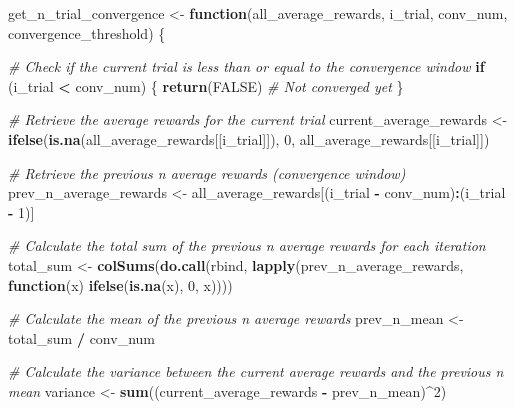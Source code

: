 \documentclass[
]{article}
\newenvironment{Shaded}{\begin{snugshade}}{\end{snugshade}}
\newcommand{\CommentTok}[1]{\textcolor[rgb]{0.56,0.35,0.01}{\textit{#1}}}
\newcommand{\ConstantTok}[1]{\textcolor[rgb]{0.56,0.35,0.01}{#1}}
\newcommand{\ControlFlowTok}[1]{\textcolor[rgb]{0.13,0.29,0.53}{\textbf{#1}}}
\newcommand{\DecValTok}[1]{\textcolor[rgb]{0.00,0.00,0.81}{#1}}
\newcommand{\FunctionTok}[1]{\textcolor[rgb]{0.13,0.29,0.53}{\textbf{#1}}}
\newcommand{\NormalTok}[1]{#1}
\newcommand{\OtherTok}[1]{\textcolor[rgb]{0.56,0.35,0.01}{#1}}
\newcommand{\SpecialCharTok}[1]{\textcolor[rgb]{0.81,0.36,0.00}{\textbf{#1}}}
\begin{document}
\begin{Shaded}
\begin{Highlighting}[]
\NormalTok{get\_n\_trial\_convergence }\OtherTok{\textless{}{-}} \ControlFlowTok{function}\NormalTok{(all\_average\_rewards, i\_trial, conv\_num, convergence\_threshold) \{}
  
  \CommentTok{\# Check if the current trial is less than or equal to the convergence window}
  \ControlFlowTok{if}\NormalTok{ (i\_trial }\SpecialCharTok{\textless{}}\NormalTok{ conv\_num) \{}
    \FunctionTok{return}\NormalTok{(}\ConstantTok{FALSE}\NormalTok{)  }\CommentTok{\# Not converged yet}
\NormalTok{  \}}
  
  \CommentTok{\# Retrieve the average rewards for the current trial}
\NormalTok{  current\_average\_rewards }\OtherTok{\textless{}{-}}  \FunctionTok{ifelse}\NormalTok{(}\FunctionTok{is.na}\NormalTok{(all\_average\_rewards[[i\_trial]]), }\DecValTok{0}\NormalTok{, all\_average\_rewards[[i\_trial]])}
  
  \CommentTok{\# Retrieve the previous n average rewards (convergence window)}
\NormalTok{  prev\_n\_average\_rewards }\OtherTok{\textless{}{-}}\NormalTok{ all\_average\_rewards[(i\_trial }\SpecialCharTok{{-}}\NormalTok{ conv\_num)}\SpecialCharTok{:}\NormalTok{(i\_trial }\SpecialCharTok{{-}} \DecValTok{1}\NormalTok{)]}
  
  \CommentTok{\# Calculate the total sum of the previous n average rewards for each iteration}
\NormalTok{  total\_sum }\OtherTok{\textless{}{-}} \FunctionTok{colSums}\NormalTok{(}\FunctionTok{do.call}\NormalTok{(rbind, }\FunctionTok{lapply}\NormalTok{(prev\_n\_average\_rewards, }\ControlFlowTok{function}\NormalTok{(x) }\FunctionTok{ifelse}\NormalTok{(}\FunctionTok{is.na}\NormalTok{(x), }\DecValTok{0}\NormalTok{, x))))}
  
  \CommentTok{\# Calculate the mean of the previous n average rewards}
\NormalTok{  prev\_n\_mean }\OtherTok{\textless{}{-}}\NormalTok{ total\_sum }\SpecialCharTok{/}\NormalTok{ conv\_num}
  
  \CommentTok{\# Calculate the variance between the current average rewards and the previous n mean}
\NormalTok{  variance }\OtherTok{\textless{}{-}} \FunctionTok{sum}\NormalTok{((current\_average\_rewards }\SpecialCharTok{{-}}\NormalTok{ prev\_n\_mean)}\SpecialCharTok{\^{}}\DecValTok{2}\NormalTok{)}
  

\end{Highlighting}
\end{Shaded}
\end{document}
